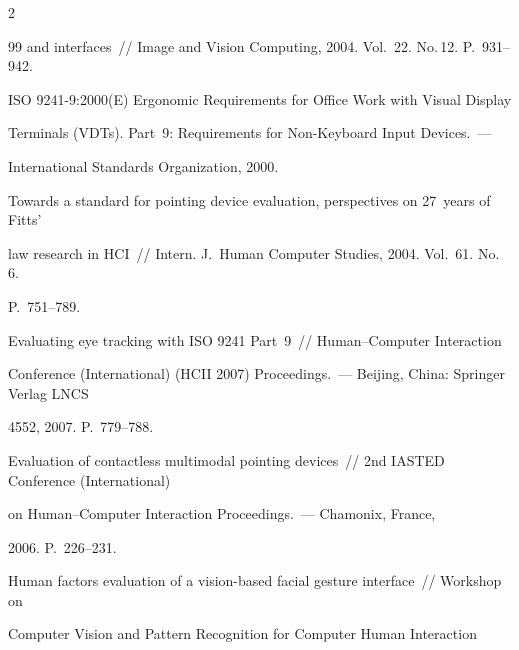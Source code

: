 \begin{multicols}{2}
{{\begin{thebibliography}{99}
and interfaces~// Image and Vision Computing, 2004. Vol.~22. No.\,12. P.~931--942.







ISO 9241-9:2000(E) Ergonomic Requirements for Office Work with Visual Display 


Terminals (VDTs). Part~9: Requirements for Non-Keyboard Input Devices.~--- 


International Standards Organization, 2000.









Towards a standard for pointing device evaluation, perspectives on 27~years of Fitts' 


law research in HCI~// Intern. J.~Human Computer Studies, 2004. Vol.~61. No.\,6. 


P.~751--789.









Evaluating eye tracking with ISO 9241 Part~9~// Human--Computer Interaction 


 Conference (International) (HCII 2007) Proceedings.~--- Beijing, China: Springer Verlag LNCS 


4552, 2007. P.~779--788.









Evaluation of contactless multimodal pointing devices~//  2nd IASTED Conference (International) 


on Human--Computer Interaction Proceedings.~--- Chamonix, France, 


2006. P.~226--231.









Human factors evaluation of a vision-based facial gesture interface~// Workshop on 


Computer Vision and Pattern Recognition for Computer Human Interaction 



\end{thebibliography}}}
\end{multicols}
